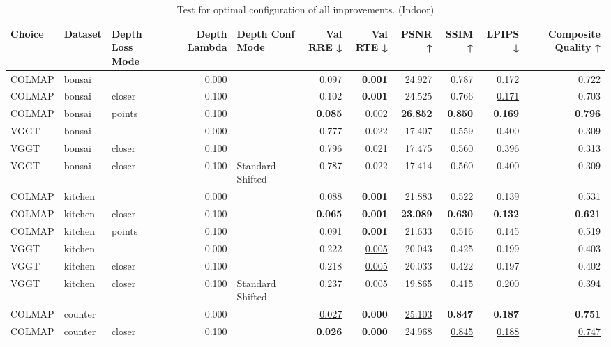\begin{table}[H]
\caption{Test for optimal configuration of all improvements. (Indoor)}
\label{tab:99_all_improvements_indoor}
\centering
\scriptsize
\begin{tabular}{lllrlrrrrrr}
\toprule
Choice & Dataset & Depth Loss Mode & Depth Lambda & Depth Conf Mode & Val RRE ↓ & Val RTE ↓ & PSNR ↑ & SSIM ↑ & LPIPS ↓ & Composite Quality ↑ \\
\midrule
COLMAP & bonsai &  & 0.000 &  & \underline{0.097} & \textbf{0.001} & \underline{24.927} & \underline{0.787} & 0.172 & \underline{0.722} \\
COLMAP & bonsai & closer & 0.100 &  & 0.102 & \textbf{0.001} & 24.525 & 0.766 & \underline{0.171} & 0.703 \\
COLMAP & bonsai & points & 0.100 &  & \textbf{0.085} & \underline{0.002} & \textbf{26.852} & \textbf{0.850} & \textbf{0.169} & \textbf{0.796} \\
VGGT & bonsai &  & 0.000 &  & 0.777 & 0.022 & 17.407 & 0.559 & 0.400 & 0.309 \\
VGGT & bonsai & closer & 0.100 &  & 0.796 & 0.021 & 17.475 & 0.560 & 0.396 & 0.313 \\
VGGT & bonsai & closer & 0.100 & Standard Shifted & 0.787 & 0.022 & 17.414 & 0.560 & 0.400 & 0.309 \\
\midrule
COLMAP & kitchen &  & 0.000 &  & \underline{0.088} & \textbf{0.001} & \underline{21.883} & \underline{0.522} & \underline{0.139} & \underline{0.531} \\
COLMAP & kitchen & closer & 0.100 &  & \textbf{0.065} & \textbf{0.001} & \textbf{23.089} & \textbf{0.630} & \textbf{0.132} & \textbf{0.621} \\
COLMAP & kitchen & points & 0.100 &  & 0.091 & \textbf{0.001} & 21.633 & 0.516 & 0.145 & 0.519 \\
VGGT & kitchen &  & 0.000 &  & 0.222 & \underline{0.005} & 20.043 & 0.425 & 0.199 & 0.403 \\
VGGT & kitchen & closer & 0.100 &  & 0.218 & \underline{0.005} & 20.033 & 0.422 & 0.197 & 0.402 \\
VGGT & kitchen & closer & 0.100 & Standard Shifted & 0.237 & \underline{0.005} & 19.865 & 0.415 & 0.200 & 0.394 \\
\midrule
COLMAP & counter &  & 0.000 &  & \underline{0.027} & \textbf{0.000} & \underline{25.103} & \textbf{0.847} & \textbf{0.187} & \textbf{0.751} \\
COLMAP & counter & closer & 0.100 &  & \textbf{0.026} & \textbf{0.000} & 24.968 & \underline{0.845} & \underline{0.188} & \underline{0.747} \\

\end{tabular}
\end{table}
